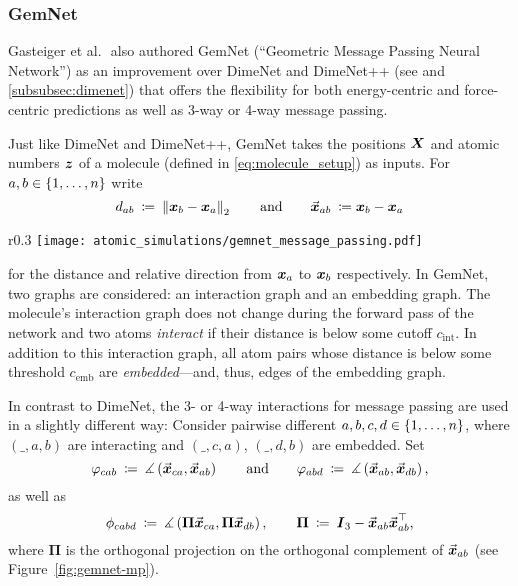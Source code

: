 \subsubsection{GemNet}
\label{subsubsec:gemnet}

Gasteiger et al. $\!\!$ also authored GemNet (\enquote{Geometric Message Passing Neural Network}) 
\cite{https://doi.org/10.48550/arxiv.2106.08903} 
as an improvement over DimeNet and DimeNet++ (see 
\cite{DBLP:journals/corr/abs-2003-03123, https://doi.org/10.48550/arxiv.2011.14115} 
and \ref{subsubsec:dimenet}) that offers the flexibility for both energy-centric 
and force-centric predictions as well as 3-way or 4-way message passing.

Just like DimeNet and DimeNet++, GemNet 
takes the positions $\boldsymbol{X}$ and atomic numbers $\boldsymbol{z}$ of a molecule 
(defined in \eqref{eq:molecule_setup}) as inputs. For $a, b \in \left\{1, \dots, n\right\}$ write
\[
    d_{ab} \: \coloneqq \: \left\lVert\boldsymbol{x}_b - \boldsymbol{x}_a\right\rVert_2 
    \qquad \text{and} \qquad 
    \vec{\boldsymbol{x}}_{ab} \: \coloneqq \boldsymbol{x}_b - \boldsymbol{x}_a
\]
\begin{wrapfigure}{r}{0.3\textwidth}
    \centering
    \vspace*{-0.75em}
    \texttt{[image: atomic\_simulations/gemnet\_message\_passing.pdf]}
    \caption{\cite{https://doi.org/10.48550/arxiv.2106.08903}}
    \label{fig:gemnet-mp}
\end{wrapfigure}
for the distance and relative direction from $\boldsymbol{x}_a$ to $\boldsymbol{x}_b$ respectively.
In GemNet, two graphs are considered: an interaction graph and an embedding graph.
The molecule's interaction graph does not change during the forward pass of the network and 
two atoms \textit{interact} if their distance is below some 
cutoff $c_{\text{int}}$. In addition to this interaction graph, all atom pairs 
whose distance is below some threshold $c_{\text{emb}}$ are \textit{embedded}---and, thus, 
edges of the embedding graph.

In contrast to DimeNet, the 3- or 4-way interactions for message passing are used 
in a slightly different way:
Consider pairwise different $a, b, c, d \in \left\{1, \dots, n\right\}$,
where $(\_, a, b)$ are interacting and $(\_, c, a)$, $(\_, d, b)$ are
embedded. Set
\[
    \varphi_{cab} \: \coloneqq \: 
    \measuredangle \left( \vec{\boldsymbol{x}}_{ca}, \vec{\boldsymbol{x}}_{ab} \right)
    \qquad \text{and} \qquad
    \varphi_{abd} \: \coloneqq \: 
    \measuredangle \left( \vec{\boldsymbol{x}}_{ab}, \vec{\boldsymbol{x}}_{db} \right) \text{,}
\]
as well as 
\[
    \phi_{cabd} \: \coloneqq \: 
    \measuredangle \left( \boldsymbol{\Pi} \vec{\boldsymbol{x}}_{ca}, \boldsymbol{\Pi} \vec{\boldsymbol{x}}_{db} \right),
    \qquad \boldsymbol{\Pi} \: \coloneqq \: 
    \boldsymbol{I}_3 - \vec{\boldsymbol{x}}_{ab} \vec{\boldsymbol{x}}_{ab}^\top \text{,}
\]
where $\boldsymbol{\Pi}$ is the orthogonal projection on the orthogonal
complement of $\vec{\boldsymbol{x}}_{ab}$ (see Figure~\ref{fig:gemnet-mp}).

